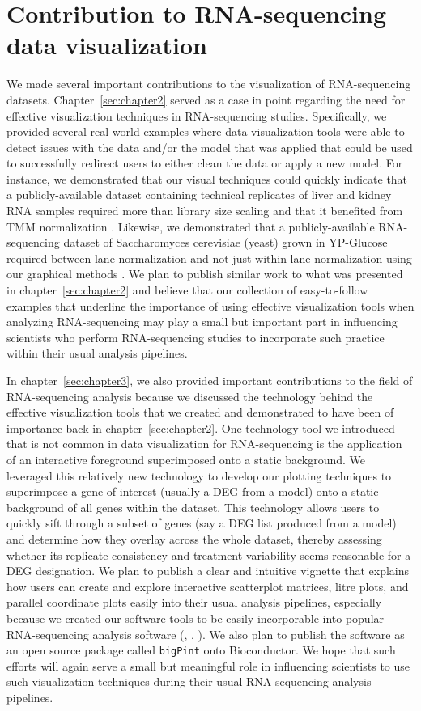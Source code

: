 \documentclass[11pt,a4paper,oldfontcommands,openany]{memoir}
\numberwithin{equation}{section} %
\newcommand{\pkg}[1]{{\texttt{#1}}}
\begin{document}
\section{Contribution to RNA-sequencing data visualization}

We made several important contributions to the visualization of RNA-sequencing datasets. Chapter~\ref{sec:chapter2} served as a case in point regarding the need for effective visualization techniques in RNA-sequencing studies. Specifically, we provided several real-world examples where data visualization tools were able to detect issues with the data and/or the model that was applied that could be used to successfully redirect users to either clean the data or apply a new model. For instance, we demonstrated that our visual techniques could quickly indicate that a publicly-available dataset containing technical replicates of liver and kidney RNA samples required more than library size scaling and that it benefited from TMM normalization \citep{Marioni}. Likewise, we demonstrated that a publicly-available RNA-sequencing dataset of Saccharomyces cerevisiae (yeast) grown in YP-Glucose required between lane normalization and not just within lane normalization using our graphical methods \cite{Risso}. We plan to publish similar work to what was presented in chapter~\ref{sec:chapter2} and believe that our collection of easy-to-follow examples that underline the importance of using effective visualization tools when analyzing RNA-sequencing may play a small but important part in influencing scientists who perform RNA-sequencing studies to incorporate such practice within their usual analysis pipelines.

In chapter~\ref{sec:chapter3}, we also provided important contributions to the field of RNA-sequencing analysis because we discussed the technology behind the effective visualization tools that we created and demonstrated to have been of importance back in chapter~\ref{sec:chapter2}. One technology tool we introduced that is not common in data visualization for RNA-sequencing is the application of an interactive foreground superimposed onto a static background. We leveraged this relatively new technology to develop our plotting techniques to superimpose a gene of interest (usually a DEG from a model) onto a static background of all genes within the dataset. This technology allows users to quickly sift through a subset of genes (say a DEG list produced from a model) and determine how they overlay across the whole dataset, thereby assessing whether its replicate consistency and treatment variability seems reasonable for a DEG designation. We plan to publish a clear and intuitive vignette that explains how users can create and explore interactive scatterplot matrices, litre plots, and parallel coordinate plots easily into their usual analysis pipelines, especially because we created our software tools to be easily incorporable into popular RNA-sequencing analysis software (\citealt{deseq2}, \citealt{edger}, \citealt{limma}). We also plan to publish the software as an open source package called \pkg{bigPint} onto Bioconductor. We hope that such efforts will again serve a small but meaningful role in influencing scientists to use such visualization techniques during their usual RNA-sequencing analysis pipelines.
\end{document}
